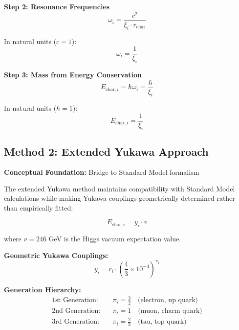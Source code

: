 \documentclass[12pt,a4paper]{report}
\begin{document}
\textbf{Step 2: Resonance Frequencies}
\begin{equation}
	\omega_i = \frac{c^2}{\xi_i \cdot r_{\text{char}}}
	\label{eq:resonance_frequencies}
\end{equation}

In natural units ($c = 1$):
\begin{equation}
	\omega_i = \frac{1}{\xi_i}
\end{equation}

\textbf{Step 3: Mass from Energy Conservation}
\begin{equation}
	E_{\text{char},i} = \hbar \omega_i = \frac{\hbar}{\xi_i}
	\label{eq:energy_from_frequency}
\end{equation}

In natural units ($\hbar = 1$):
\begin{equation}
	\boxed{E_{\text{char},i} = \frac{1}{\xi_i}}
	\label{eq:characteristic_energy_direct}
\end{equation}

\subsection{Method 2: Extended Yukawa Approach}
\label{subsec:extended_yukawa_method}

\textbf{Conceptual Foundation:} Bridge to Standard Model formalism

The extended Yukawa method maintains compatibility with Standard Model calculations while making Yukawa couplings geometrically determined rather than empirically fitted:

\begin{equation}
	E_{\text{char},i} = y_i \cdot v
	\label{eq:yukawa_mass_formula}
\end{equation}

where $v = 246$ GeV is the Higgs vacuum expectation value.

\textbf{Geometric Yukawa Couplings:}
\begin{equation}
	\boxed{y_i = r_i \cdot \left(\frac{4}{3} \times 10^{-4}\right)^{\pi_i}}
	\label{eq:geometric_yukawa}
\end{equation}

\textbf{Generation Hierarchy:}
\begin{align}
	\text{1st Generation:} \quad &\pi_i = \frac{3}{2} \quad \text{(electron, up quark)} \\
	\text{2nd Generation:} \quad &\pi_i = 1 \quad \text{(muon, charm quark)} \\
	\text{3rd Generation:} \quad &\pi_i = \frac{2}{3} \quad \text{(tau, top quark)}
\end{align}
\end{document}
